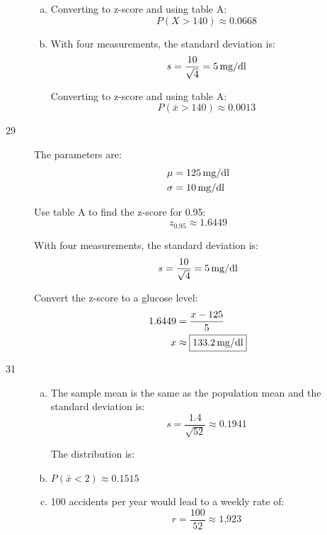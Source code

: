 \documentclass[letterpaper, landscape]{exam}
\begin{document}
\begin{description}
        \begin{enumerate}[(a)]
          \item 
            Converting to z-score and using table A:
            \[
              P(X > 140) \approx \boxed{ 0.0668 }
            \]

          \item 
            With four measurements, the standard deviation is:
            \[
              s = \frac{10}{\sqrt{4}} = \unit[5]{mg/dl}
            \]

            Converting to z-score and using table A:
            \[
              P(\bar{x} > 140) \approx \boxed{ 0.0013 }
            \]
        \end{enumerate}

      \item[29]
        The parameters are:
        \begin{align*}
          \mu    & = \unit[125]{mg/dl} \\
          \sigma & = \unit[10]{mg/dl} \\
        \end{align*}

        Use table A to find the z-score for 0.95:
        \[
          z_{0.95} \approx 1.6449
        \]

        With four measurements, the standard deviation is:
        \[
          s = \frac{10}{\sqrt{4}} = \unit[5]{mg/dl}
        \]

        Convert the z-score to a glucose level:
        \begin{align*}
          1.6449 & = \frac{x - 125}{5} \\
          x      & \approx \boxed{ \unit[133.2]{mg/dl} } \\
        \end{align*}

      \item[31]
        \begin{enumerate}[(a)]
          \item The sample mean is the same as the population mean and the
            standard deviation is:
            \[
              s = \frac{1.4}{\sqrt{52}} \approx 0.1941
            \]

            The distribution is: 

          \item $P(\bar{x} < 2) \approx \boxed{ 0.1515 }$

          \item 100 accidents per year would lead to a weekly rate of:
            \[
              r = \frac{100}{52} \approx 1.923
            \]


\end{enumerate}
\end{description}
\end{document}

